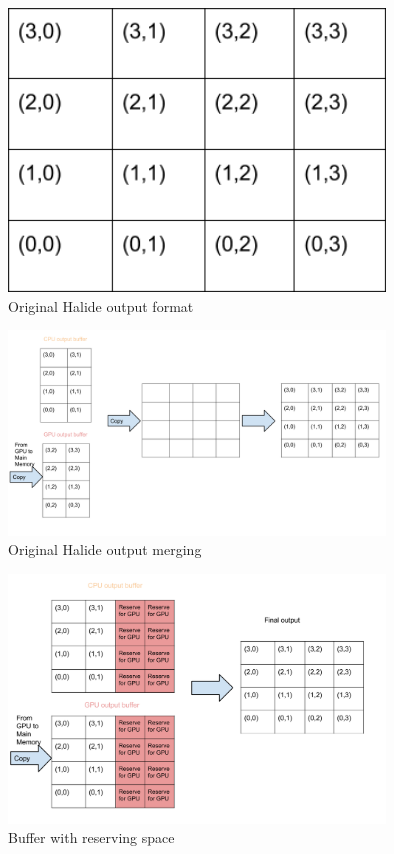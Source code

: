 \begin{figure}[H]
\centering
\includegraphics[width=10cm]{img/memory_full.png}
\caption{Original Halide output format}
\label{fig:Halide_default}
\end{figure}

\begin{figure}[H]
\centering
\includegraphics[width=10cm]{img/Memory_copy.png}
\caption{Original Halide output merging}
\label{fig:Halide_default1}
\end{figure}

\begin{figure}[H]
\centering
\includegraphics[width=10cm]{img/Memory_copy_new.png}
\caption{Buffer with reserving space}
\label{fig:memory_new}
\end{figure}



